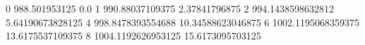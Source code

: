 0 988.501953125 0.0
1 990.88037109375 2.37841796875
2 994.1438598632812 5.64190673828125
4 998.8478393554688 10.34588623046875
6 1002.1195068359375 13.6175537109375
8 1004.1192626953125 15.6173095703125
